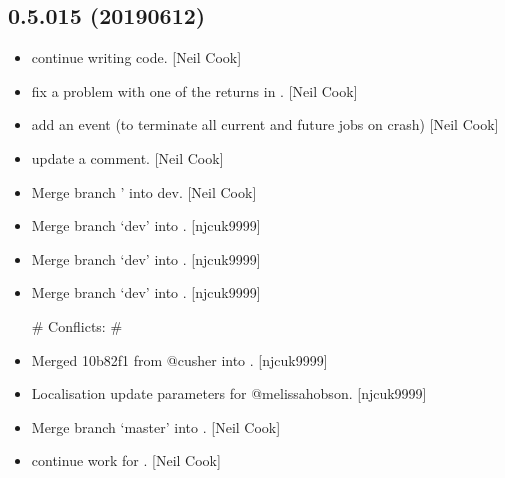 \documentclass[a4paper,10pt,english]{report}
\begin{document}
\subsection{0.5.015 (2019\sphinxhyphen{}06\sphinxhyphen{}12)}
\label{\detokenize{misc/changelog:id140}}\begin{itemize}
\item {} 
 \sphinxhyphen{} continue writing code. {[}Neil Cook{]}

\item {} 
 \sphinxhyphen{} fix a problem with one of the returns in
. {[}Neil Cook{]}

\item {} 
 \sphinxhyphen{} add an event (to terminate all current and
future jobs on crash) {[}Neil Cook{]}

\item {} 
 \sphinxhyphen{} update a comment. {[}Neil Cook{]}

\item {} 
Merge branch ’ into dev. {[}Neil Cook{]}

\item {} 
Merge branch ‘dev’ into . {[}njcuk9999{]}

\item {} 
Merge branch ‘dev’ into . {[}njcuk9999{]}

\item {} 
Merge branch ‘dev’ into . {[}njcuk9999{]}

\# Conflicts:
\#    

\item {} 
 \sphinxhyphen{} Merged 10b82f1 from @cusher into . {[}njcuk9999{]}

\item {} 
Localisation \sphinxhyphen{} update parameters for @melissa\sphinxhyphen{}hobson. {[}njcuk9999{]}

\item {} 
Merge branch ‘master’ into . {[}Neil Cook{]}

\item {} 
 \sphinxhyphen{} continue work for . {[}Neil Cook{]}


\end{itemize}
\end{document}
